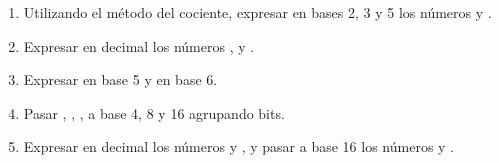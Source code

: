 \begin{enunciado}
	{\ejercicio}
	\begin{enumerate}[label=\alph{*})]
		\item Utilizando el método del cociente, expresar en bases 2, 3 y 5 los números
			 y .

		\item Expresar en decimal los números ,  y
			.

		\item Expresar  en base 5 y  en base 6.

		\item Pasar , ,
			, a base 4, 8 y 16 agrupando bits.

		\item Expresar en decimal los números  
  			y , y pasar a base 16 los números  y .
	\end{enumerate}
\end{enunciado}

